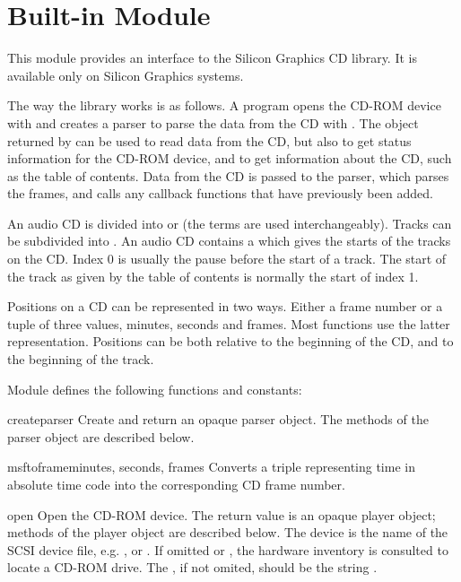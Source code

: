 \section{Built-in Module }
\label{module-cd}

This module provides an interface to the Silicon Graphics CD library.
It is available only on Silicon Graphics systems.

The way the library works is as follows.  A program opens the CD-ROM
device with  and creates a parser to parse the data
from the CD with .  The object returned by
 can be used to read data from the CD, but also to get
status information for the CD-ROM device, and to get information about
the CD, such as the table of contents.  Data from the CD is passed to
the parser, which parses the frames, and calls any callback
functions that have previously been added.

An audio CD is divided into  or  (the terms
are used interchangeably).  Tracks can be subdivided into
.  An audio CD contains a  which
gives the starts of the tracks on the CD.  Index 0 is usually the
pause before the start of a track.  The start of the track as given by
the table of contents is normally the start of index 1.

Positions on a CD can be represented in two ways.  Either a frame
number or a tuple of three values, minutes, seconds and frames.  Most
functions use the latter representation.  Positions can be both
relative to the beginning of the CD, and to the beginning of the
track.

Module  defines the following functions and constants:


\begin{funcdesc}{createparser}{}
Create and return an opaque parser object.  The methods of the parser
object are described below.
\end{funcdesc}

\begin{funcdesc}{msftoframe}{minutes, seconds, frames}
Converts a  triple
representing time in absolute time code into the corresponding CD
frame number.
\end{funcdesc}

\begin{funcdesc}{open}{}
Open the CD-ROM device.  The return value is an opaque player object;
methods of the player object are described below.  The device is the
name of the SCSI device file, e.g. , or
.  If omitted or , the hardware inventory is
consulted to locate a CD-ROM drive.  The , if not omited,
should be the string .
\end{funcdesc}

